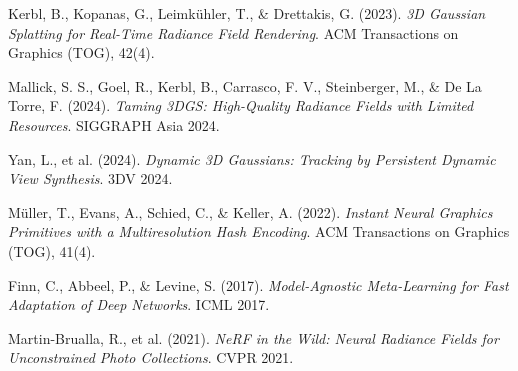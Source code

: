 \documentclass[11pt,letterpaper]{article}
\begin{document}

\begin{thebibliography}{99}

Kerbl, B., Kopanas, G., Leimkühler, T., \& Drettakis, G. (2023).
\textit{3D Gaussian Splatting for Real-Time Radiance Field Rendering}.
ACM Transactions on Graphics (TOG), 42(4).

Mallick, S. S., Goel, R., Kerbl, B., Carrasco, F. V., Steinberger, M., \& De La Torre, F. (2024).
\textit{Taming 3DGS: High-Quality Radiance Fields with Limited Resources}.
SIGGRAPH Asia 2024.

Yan, L., et al. (2024).
\textit{Dynamic 3D Gaussians: Tracking by Persistent Dynamic View Synthesis}.
3DV 2024.

Müller, T., Evans, A., Schied, C., \& Keller, A. (2022).
\textit{Instant Neural Graphics Primitives with a Multiresolution Hash Encoding}.
ACM Transactions on Graphics (TOG), 41(4).

Finn, C., Abbeel, P., \& Levine, S. (2017).
\textit{Model-Agnostic Meta-Learning for Fast Adaptation of Deep Networks}.
ICML 2017.

Martin-Brualla, R., et al. (2021).
\textit{NeRF in the Wild: Neural Radiance Fields for Unconstrained Photo Collections}.
CVPR 2021.

\end{thebibliography}
\end{document}
